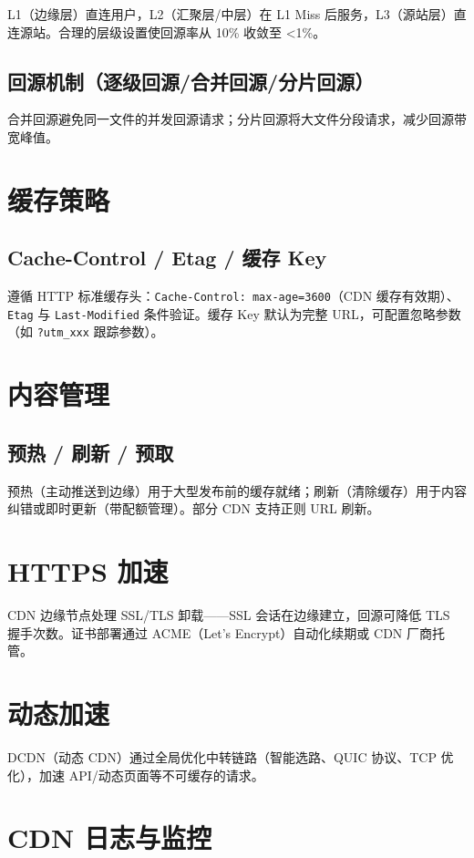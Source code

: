 \documentclass[12pt,UTF8]{ctexbook}
\begin{document}
L1（边缘层）直连用户，L2（汇聚层/中层）在 L1 Miss 后服务，L3（源站层）直连源站。合理的层级设置使回源率从 10\% 收敛至 <1\%。

    \subsection{回源机制（逐级回源/合并回源/分片回源）}

合并回源避免同一文件的并发回源请求；分片回源将大文件分段请求，减少回源带宽峰值。

  \section{缓存策略}
    \subsection{Cache-Control / Etag / 缓存 Key}

遵循 HTTP 标准缓存头：\verb|Cache-Control: max-age=3600|（CDN 缓存有效期）、\verb|Etag| 与 \verb|Last-Modified| 条件验证。缓存 Key 默认为完整 URL，可配置忽略参数（如 \verb|?utm_xxx| 跟踪参数）。

  \section{内容管理}
    \subsection{预热 / 刷新 / 预取}

预热（主动推送到边缘）用于大型发布前的缓存就绪；刷新（清除缓存）用于内容纠错或即时更新（带配额管理）。部分 CDN 支持正则 URL 刷新。

  \section{HTTPS 加速}

CDN 边缘节点处理 SSL/TLS 卸载——SSL 会话在边缘建立，回源可降低 TLS 握手次数。证书部署通过 ACME（Let's Encrypt）自动化续期或 CDN 厂商托管。

  \section{动态加速}

DCDN（动态 CDN）通过全局优化中转链路（智能选路、QUIC 协议、TCP 优化），加速 API/动态页面等不可缓存的请求。

  \section{CDN 日志与监控}
\end{document}
